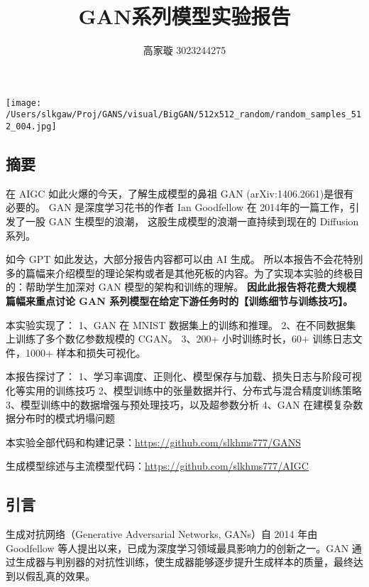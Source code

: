 \documentclass[12pt, a4paper]{article}
\title{GAN系列模型实验报告}
\author{高家璇 3023244275}
\begin{document}
\maketitle
\begin{center}
    \texttt{[image: /Users/slkgaw/Proj/GANS/visual/BigGAN/512x512\_random/random\_samples\_512\_004.jpg]}
\end{center}
\begin{center}
\section*{摘要}
\end{center}

在 AIGC 如此火爆的今天，了解生成模型的鼻祖 GAN (arXiv:1406.2661)是很有必要的。
GAN 是深度学习花书的作者 Ian Goodfellow 在 2014年的一篇工作，引发了一股 GAN 生模型的浪潮，
这股生成模型的浪潮一直持续到现在的 Diffusion 系列。

如今 GPT 如此发达，大部分报告内容都可以由 AI 生成。
所以本报告不会花特别多的篇幅来介绍模型的理论架构或者是其他死板的内容。为了实现本实验的终极目的：帮助学生加深对 GAN 模型的架构和训练的理解。
\textbf{因此此报告将花费大规模篇幅来重点讨论 GAN 系列模型在给定下游任务时的【训练细节与训练技巧】。}

本实验实现了：
1、GAN 在 MNIST 数据集上的训练和推理。
2、在不同数据集上训练了多个数亿参数规模的 CGAN。
3、200+ 小时训练时长，60+ 训练日志文件，1000+ 样本和损失可视化。


本报告探讨了：
1、学习率调度、正则化、模型保存与加载、损失日志与阶段可视化等实用的训练技巧
2、模型训练中的张量数据并行、分布式与混合精度训练策略
3、模型训练中的数据增强与预处理技巧，以及超参数分析
4、GAN 在建模复杂数据分布时的模式坍塌问题



本实验全部代码和构建记录：\url{https://github.com/slkhms777/GANS}

生成模型综述与主流模型代码：\url{https://github.com/slkhms777/AIGC}



\newpage
\begin{center}
\section*{引言}
\end{center}

生成对抗网络（Generative Adversarial Networks, GANs）自 2014 年由 Goodfellow 等人提出以来，已成为深度学习领域最具影响力的创新之一。GAN 通过生成器与判别器的对抗性训练，使生成器能够逐步提升生成样本的质量，最终达到以假乱真的效果。
\end{document}
